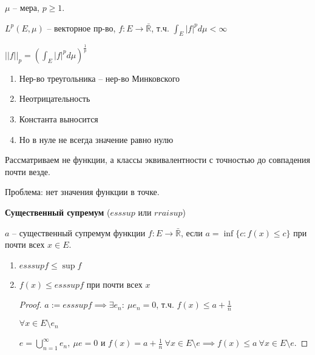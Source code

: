 
\begin{definition}
    $\mu$ -- мера, $p \geq 1$.

    $L^{p} (E, \mu)$ -- векторное пр-во, $f : E \rightarrow \bar{\mathbb{R}}$, т.ч. $\int_{E} |f|^p d\mu < \infty$

    $|| f ||_p = \left( \int_{E} |f|^p d\mu \right)^{\frac{1}{p}}$
    
    \begin{enumerate}
        \item Нер-во треугольника -- нер-во Минковского
        \item Неотрицательность
        \item Константа выносится
        \item Но в нуле не всегда значение равно нулю
    \end{enumerate}
    
    Рассматриваем не функции, а классы эквивалентности с точностью до совпадения почти везде.

    Проблема: нет значения функции в точке.
\end{definition}

\begin{definition}
    \textbf{Существенный супремум} ($esssup$ или $rraisup$)

    $a$ -- существенный супремум функции $f: E \rightarrow \bar{\mathbb{R}}$, если $a = \inf \{ c : f(x) \leq c \}$ при почти всех $x \in E$.
\end{definition}

\begin{properties}
    \begin{enumerate}
        \item $esssup f \leq \sup f$
        \item {
            $f(x) \leq esssup f$ при почти всех $x$

            \begin{proof}
                $a := esssup f \implies \exists e_n : \ \mu e_n = 0$, т.ч. $f(x) \leq a + \frac{1}{n}$

                $\forall x \in E \setminus e_n$

                $e = \bigcup_{n=1}^{\infty} e_n, \ \mu e = 0$ и $f(x) = a + \frac{1}{n} \ \forall x \in E \setminus e \implies f(x) \leq a \ \forall x \in E \setminus e$.
            \end{proof}
        }
    \end{enumerate}
\end{properties}

